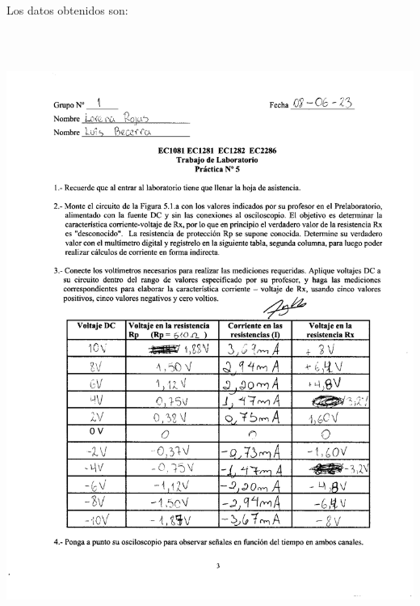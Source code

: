 \documentclass[12pt]{article}
\begin{document}
	\noindent Los datos obtenidos son:
	
	\begin{center}
		\includegraphics[width=16cm,height=20cm]{Img/anexo_0001}
	\end{center}
	
\end{document}
